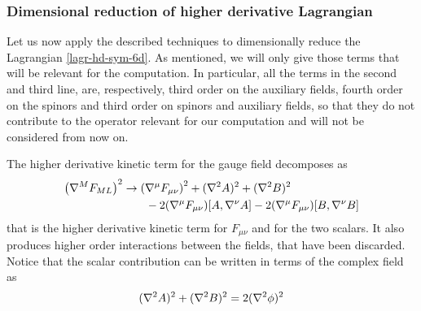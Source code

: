 \subsubsection{Dimensional reduction of higher derivative Lagrangian}


Let us now apply the described techniques  to dimensionally reduce the Lagrangian \eqref{lagr-hd-sym-6d}. As mentioned, we will only give those terms that will be relevant for the computation.
In particular, all the terms in the second and third %
 line, 
are, respectively, third order on the auxiliary fields, fourth order on the spinors and third order on spinors and auxiliary fields, so that they do not contribute to the operator relevant for our computation and will not be considered from now on. 


The higher derivative kinetic term for the gauge field decomposes as
\begin{equation}\label{dim-red-covdF2}
\begin{split}
\left( { \mathcal{\nabla} }^M F_{ML} \right)^2
	& \rightarrow
		\left( { \mathcal{\nabla} }^\mu F_{\mu\nu} \right)^2
		+ ( { \mathcal{\nabla} }^2 A )^2
		+ ( { \mathcal{\nabla} }^2 B )^2
	\\
	&
	\qquad
	- 2 ( { \mathcal{\nabla} }^\mu F_{ \mu \nu } )[ A , { \mathcal{\nabla} }^\nu A ]
	- 2 ( { \mathcal{\nabla} }^\mu F_{ \mu \nu } )[ B , { \mathcal{\nabla} }^\nu B ]
\end{split}
\end{equation}
that is the higher derivative kinetic term for $F_{\mu\nu}$ and for the two scalars. It also produces higher order interactions between the fields, that have been discarded. Notice that the scalar contribution can be written in terms of the complex field as
\begin{equation}
( { \mathcal{\nabla} }^2 A )^2
+
( { \mathcal{\nabla} }^2 B )^2
=
2 ( { \mathcal{\nabla} }^2 \phi )^2
\end{equation}



